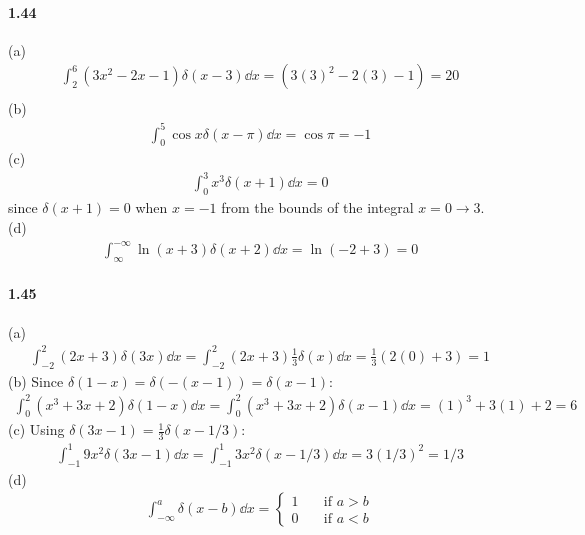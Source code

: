 \documentclass[../main.tex]{subfiles}
\begin{document}
\paragraph{1.44}
(a)
\begin{align*}
    \int_{2}^6 (3x^2 - 2x - 1) \delta(x - 3) \dd{x} = (3(3)^2 - 2(3) - 1) =  20 \\
\end{align*}
(b)
\begin{align*}
    \int_0^5 \cos{x} \delta(x - \pi) \dd{x} = \cos{\pi} = -1
\end{align*}
(c)
\begin{align*}
    \int_0^3 x^3 \delta(x + 1) \dd{x} = 0
\end{align*}
since $\delta(x + 1) = 0$ when $x = -1$ from the bounds of the integral $x = 0 \to 3$. \\
(d) 
\begin{align*}
    \int_{\infty}^{-\infty} \ln(x + 3) \delta(x + 2) \dd{x} = \ln(-2 + 3) = 0
\end{align*}

\paragraph{1.45}
(a)
\begin{align*}
    \int_{-2}^2 (2x + 3) \delta(3x) \dd{x} = \int_{-2}^2 (2x + 3) \frac{1}{3} \delta(x) \dd{x}
    = \frac{1}{3} (2(0) + 3) = 1
\end{align*}
(b) Since $\delta(1 - x) = \delta(-(x - 1)) = \delta(x - 1)$:
\begin{align*}
    \int_0^2 (x^3 + 3x + 2) \delta(1 - x) \dd{x} = \int_0^2 (x^3 + 3x + 2) \delta(x - 1) \dd{x}
    = (1)^3 + 3(1) + 2 = 6
\end{align*}
(c) Using $\delta(3x - 1) = \frac{1}{3} \delta(x - 1/3)$:
\begin{align*}
    \int_{-1}^1 9x^2 \delta(3x - 1) \dd{x} = \int_{-1}^1 3x^2 \delta(x - 1/3) \dd{x}
    = 3(1/3)^2 = 1/3
\end{align*}
(d)
\begin{align*}
    \int_{-\infty}^a \delta(x - b) \dd{x} = 
    \begin{cases}
        1 & \quad \text{if } a > b \\
        0 & \quad \text{if } a < b
    \end{cases}
\end{align*}
\end{document}
